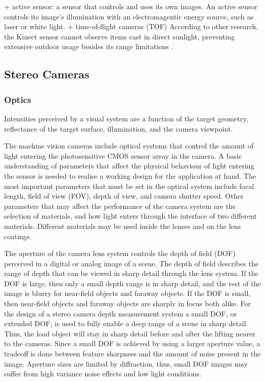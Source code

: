 \documentclass[12pt,a4paper,oneside,pdftex]{report}
\begin{document}
+ active sensor: a sensor that controls and uses its own images. An active sensor controls its image's illumination with an electromagentic energy source, such as laser or white light.
+ time-of-flight cameras (TOF)
According to other research, the Kinect sensor cannot observe items cast in direct sunlight, preventing extensive outdoor usage besides its range limitations \cite{tikkanen13}.  

\subsection{Stereo Cameras}
\label{subsection:stereo_cameras}

\subsubsection{Optics}
\label{subsubsection:optics_and_photometrics}


Intensities perceived by a visual system are a function of the target geometry, reflectance of the target surface, illumination, and the camera viewpoint.

The machine vision cameras include optical systems that control the amount of light entering the photosensitive CMOS sensor array in the camera. A basic understanding of parameters that affect the physical behaviour of light entering the sensor is needed to realise a working design for the application at hand. The most important parameters that must be set in the optical system include focal length, field of view (FOV), depth of view, and camera shutter speed. Other parameters that may affect the performance of the camera system are the selection of materials, and how light enters through the interface of two different materials. Different materials may be used inside the lenses and on the lens coatings. 

The aperture of the camera lens system controls the depth of field (DOF) perceived in a digital or analog image of a scene. The depth of field describes the range of depth that can be viewed in sharp detail through the lens system. If the DOF is large, then only a small depth range is in sharp detail, and the rest of the image is blurry for near-field objects and faraway objects. If the DOF is small, then near-field objects and faraway objects are sharply in focus both alike. For the design of a stereo camera depth measurement system a small DOF, or extended DOF, is used to fully enable a deep range of a scene in sharp detail. Thus, the load object will stay in sharp detail before and after the lifting nearer to the cameras. Since a small DOF is achieved by using a larger aperture value, a tradeoff is done between feature sharpness and the amount of noise present in the image. Aperture sizes are limited by diffraction, thus, small DOF images may suffer from high variance noise effects and low light conditions.
\end{document}
